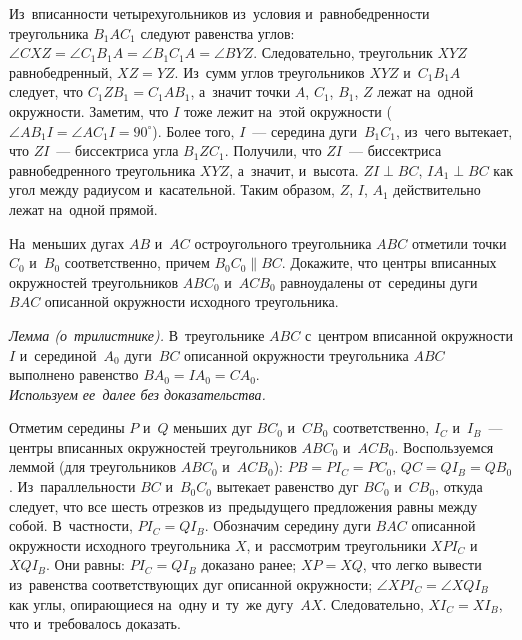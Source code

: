 \ifincludesolutions
Из~вписанности четырехугольников из~условия и~равнобедренности треугольника
$B_1 A C_1$ следуют равенства углов:
$\angle CXZ = \angle C_1 B_1 A = \angle B_1 C_1 A = \angle BYZ$.
Следовательно, треугольник $XYZ$ равнобедренный, $XZ = YZ$.
Из~сумм углов треугольников $XYZ$ и~$C_1 B_1 A$ следует, что
$C_1 Z B_1 = C_1 A B_1$, а~значит точки $A$, $C_1$, $B_1$, $Z$ лежат на~одной
окружности.
Заметим, что $I$ тоже лежит на~этой окружности
($\angle A B_1 I = \angle A C_1 I = 90^{\circ}$).
Более того, $I$~--- середина дуги~$B_1 C_1$, из~чего вытекает,
что $ZI$~--- биссектриса угла $B_1 Z C_1$.
Получили, что $ZI$~--- биссектриса равнобедренного треугольника $XYZ$,
а~значит, и~высота.
$ZI \perp BC$, $I A_1 \perp BC$ как угол между радиусом и~касательной.
Таким образом, $Z$, $I$, $A_1$ действительно лежат на~одной прямой.
\fi %

\begin{problems}

\item
На~меньших дугах $AB$ и~$AC$ остроугольного треугольника $ABC$ отметили
точки $C_0$ и~$B_0$ соответственно, причем $B_0 C_0 \parallel BC$.
Докажите, что центры вписанных окружностей треугольников $A B C_0$ и~$A C B_0$
равноудалены от~середины дуги $BAC$ описанной окружности исходного
треугольника.

\end{problems}

\ifincludesolutions
\emph{Лемма (о~трилистнике).}
В~треугольнике $ABC$ с~центром вписанной окружности $I$ и~серединой~$A_0$
дуги~$BC$ описанной окружности треугольника $ABC$ выполнено равенство
$B A_0 = I A_0 = C A_0$.
\\
\emph{Используем ее~далее без доказательства.}
\par
Отметим середины $P$ и~$Q$ меньших дуг $B C_0$ и~$C B_0$ соответственно,
$I_C$ и~$I_B$~--- центры вписанных окружностей треугольников
$A B C_0$ и~$A C B_0$.
Воспользуемся леммой (для треугольников $A B C_0$ и~$A C B_0$):
$P B = P I_C = P C_0$, $Q C = Q I_B = Q B_0$.
Из~параллельности $BC$ и~$B_0 C_0$ вытекает равенство дуг $B C_0$ и~$C B_0$,
откуда следует, что все шесть отрезков из~предыдущего предложения равны между
собой.
В~частности, $P I_C = Q I_B$.
Обозначим середину дуги $BAC$ описанной окружности исходного треугольника $X$,
и~рассмотрим треугольники $X P I_C$ и~$X Q I_B$.
Они равны: $P I_C = Q I_B$ доказано ранее; $XP = XQ$, что легко вывести
из~равенства соответствующих дуг описанной окружности;
$\angle X P I_C = \angle X Q I_B$ как углы, опирающиеся на~одну и~ту~же
дугу~$AX$.
Следовательно, $X I_C = X I_B$, что и~требовалось доказать.
\fi %

